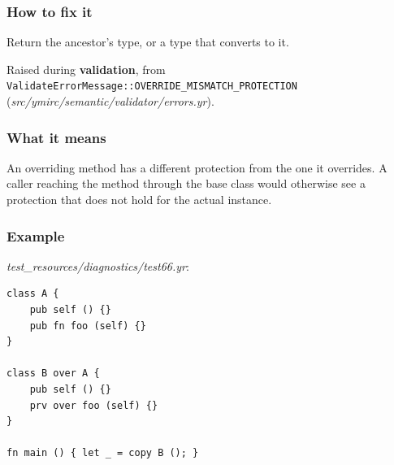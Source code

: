 \subsubsection*{How to fix it}

Return the ancestor's type, or a type that converts to it.

\label{sec:codes:e4185}

Raised during \textbf{validation}, from \texttt{ValidateErrorMessage::\allowbreak{}OVERRIDE\_\allowbreak{}MISMATCH\_\allowbreak{}PROTECTION} (\textit{src/\allowbreak{}ymirc/\allowbreak{}semantic/\allowbreak{}validator/\allowbreak{}errors.yr}).

\subsubsection*{What it means}

An overriding method has a different protection from the one it overrides. A caller reaching the method through the base class would otherwise see a protection that does not hold for the actual instance.

\subsubsection*{Example}

\textit{test\_\allowbreak{}resources/\allowbreak{}diagnostics/\allowbreak{}test66.yr}:

\begin{lstlisting}[style=coloredverbatimError]
class A {
    pub self () {}
    pub fn foo (self) {}
}

class B over A {
    pub self () {}
    prv over foo (self) {}
}

fn main () { let _ = copy B (); }
\end{lstlisting}

